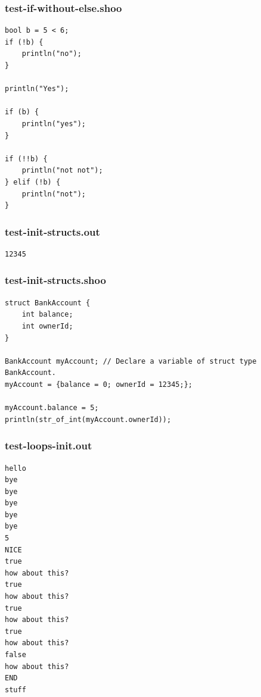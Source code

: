 \documentclass[12pt]{article}
\begin{document}
\subsubsection{test-if-without-else.shoo}
\begin{mdframed}[hidealllines=true,backgroundcolor=blue!10]
\begin{lstlisting}
bool b = 5 < 6;
if (!b) {
    println("no");
}

println("Yes");

if (b) {
    println("yes");
}

if (!!b) {
    println("not not");
} elif (!b) {
    println("not");
}
\end{lstlisting}
\end{mdframed}
\subsubsection{test-init-structs.out}
\begin{mdframed}[hidealllines=true,backgroundcolor=green!10]
\begin{lstlisting}
12345\end{lstlisting}
\end{mdframed}
\subsubsection{test-init-structs.shoo}
\begin{mdframed}[hidealllines=true,backgroundcolor=blue!10]
\begin{lstlisting}
struct BankAccount {
	int balance;
	int ownerId;
}

BankAccount myAccount; // Declare a variable of struct type BankAccount.
myAccount = {balance = 0; ownerId = 12345;};

myAccount.balance = 5;
println(str_of_int(myAccount.ownerId));\end{lstlisting}
\end{mdframed}
\subsubsection{test-loops-init.out}
\begin{mdframed}[hidealllines=true,backgroundcolor=green!10]
\begin{lstlisting}
hello
bye
bye
bye
bye
bye
5
NICE
true
how about this?
true
how about this?
true
how about this?
true
how about this?
false
how about this?
END
stuff\end{lstlisting}
\end{mdframed}
\end{document}
